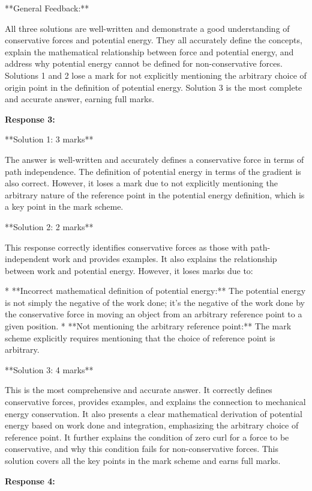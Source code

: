 \documentclass[a4paper,11pt]{article}
\begin{document}
**General Feedback:**

All three solutions are well-written and demonstrate a good understanding of conservative forces and potential energy. They all accurately define the concepts, explain the mathematical relationship between force and potential energy, and address why potential energy cannot be defined for non-conservative forces. Solutions 1 and 2 lose a mark for not explicitly mentioning the arbitrary choice of origin point in the definition of potential energy. Solution 3 is the most complete and accurate answer, earning full marks.

\bigskip    
\textbf{Response 3:}

**Solution 1: 3 marks**

The answer is well-written and accurately defines a conservative force in terms of path independence. The definition of potential energy in terms of the gradient is also correct. However, it loses a mark due to not explicitly mentioning the arbitrary nature of the reference point in the potential energy definition, which is a key point in the mark scheme.

**Solution 2: 2 marks**

This response correctly identifies conservative forces as those with path-independent work and provides examples. It also explains the relationship between work and potential energy. However, it loses marks due to:

* **Incorrect mathematical definition of potential energy:**  The potential energy is not simply the negative of the work done; it's the negative of the work done by the conservative force in moving an object from an arbitrary reference point to a given position.
* **Not mentioning the arbitrary reference point:** The mark scheme explicitly requires mentioning that the choice of reference point is arbitrary.

**Solution 3: 4 marks**

This is the most comprehensive and accurate answer. It correctly defines conservative forces, provides examples, and explains the connection to mechanical energy conservation. It also presents a clear mathematical derivation of potential energy based on work done and integration, emphasizing the arbitrary choice of reference point. It further explains the condition of zero curl for a force to be conservative, and why this condition fails for non-conservative forces. This solution covers all the key points in the mark scheme and earns full marks.

\textbf{Response 4:}
\end{document}
